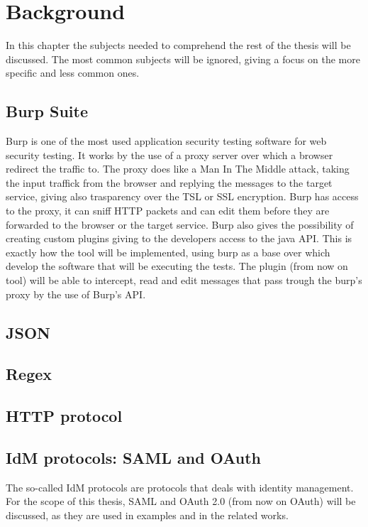 \printglossary

\chapter{Background}
In this chapter the subjects needed to comprehend the rest of the thesis will be discussed. The most common subjects will be ignored, giving a focus on the more specific and less common ones.

\section{Burp Suite}
Burp is one of the most used application security testing software for web security testing. It works by the use of a proxy server over which a browser redirect the traffic to. The proxy does like a Man In The Middle attack, taking the input traffick from the browser and replying the messages to the target service, giving also trasparency over the TSL or SSL encryption. Burp has access to the proxy, it can sniff HTTP packets and can edit them before they are forwarded to the browser or the target service. Burp also gives the possibility of creating custom plugins giving to the developers access to the java API. This is exactly how the tool will be implemented, using burp as a base over which develop the software that will be executing the tests. The plugin (from now on tool) will be able to intercept, read and edit messages that pass trough the burp's proxy by the use of Burp's API.

\section{JSON}


\section{Regex}


\section{HTTP protocol}


\section{IdM protocols: SAML and OAuth}
The so-called IdM protocols are protocols that deals with identity management. For the scope of this thesis, SAML and OAuth 2.0 (from now on OAuth) will be discussed, as they are used in examples and in the related works.

